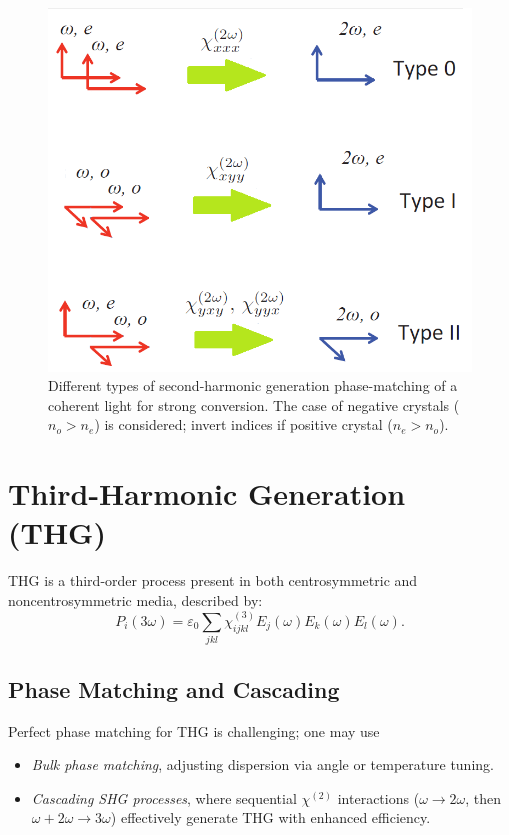 \documentclass[9pt,a4paper,twocolumn,twoside]{tau-class/tau}
\begin{document}
\begin{figure}[!ht] %
\centering
\includegraphics[width=0.7\columnwidth]{figures/TypeX_SHG.png}
\caption{Different types of second-harmonic generation phase-matching of a coherent light for strong conversion. The case of negative crystals ($n_o > n_e$) is considered; invert indices if positive crystal ($n_e > n_o$). \cite{PhasemathingImage}}
\end{figure}

\section{Third-Harmonic Generation (THG)}
THG is a third-order process present in both centrosymmetric and noncentrosymmetric media, described by:
\begin{equation}
P_i(3\omega) = \varepsilon_0 \sum_{jkl} \chi^{(3)}_{ijkl} E_j(\omega)E_k(\omega)E_l(\omega).
\end{equation}

\subsection{Phase Matching and Cascading}
Perfect phase matching for THG is challenging; one may use
\begin{itemize}
\item \emph{Bulk phase matching}, adjusting dispersion via angle or temperature tuning.
\item \emph{Cascading SHG processes}, where sequential $\chi^{(2)}$ interactions ($\omega \to 2\omega$, then $\omega+2\omega \to 3\omega$) effectively generate THG with enhanced efficiency.
\end{itemize}

\end{document}

